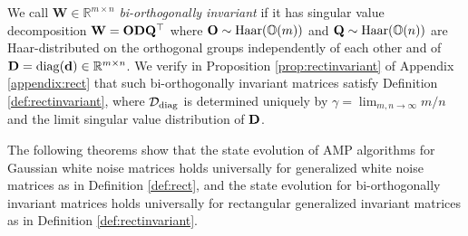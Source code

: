 \documentclass[10pt,reqno]{amsart}
\def\R{\mathbb{R}}
\def\diag{\operatorname{diag}}
\def\bW{{\mathbf{W}}}
\def\Haar{\operatorname{Haar}}
\def\OO{\mathbb{O}}
\newcommand{\tdiag}{\mathrm{diag}}
\begin{document}
We call $\bW \in \R^{m \times n}$ \emph{bi-orthogonally invariant}
if it has singular value decomposition $\bW=\bO\bD\bQ^\top$ where
$\bO \sim \Haar(\OO(m))$ and
$\bQ \sim \Haar(\OO(n))$ are Haar-distributed on the orthogonal groups
independently of each other and of $\bD=\diag(\bd) \in \R^{m \times n}$. We verify in Proposition
\ref{prop:rectinvariant} of Appendix \ref{appendix:rect} that such
bi-orthogonally invariant matrices
satisfy Definition \ref{def:rectinvariant}, where $\cD_\tdiag$ is determined
uniquely by $\gamma=\lim_{m,n \to \infty} m/n$ and the limit singular value
distribution of $\mathbf{D}$.

The following theorems show that the state evolution of AMP algorithms for
Gaussian white noise matrices holds universally for generalized white noise
matrices as in Definition \ref{def:rect},
and the state evolution for
bi-orthogonally invariant matrices holds universally for rectangular generalized
invariant matrices as in Definition \ref{def:rectinvariant}.
\end{document}
